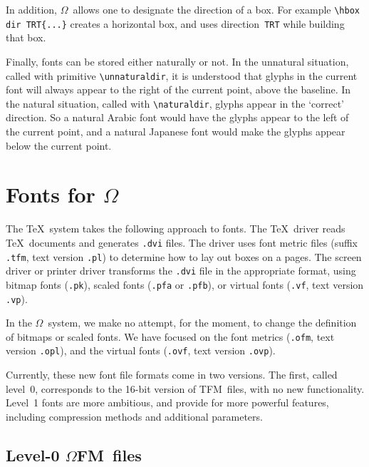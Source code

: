 \documentclass[fleqn]{article}
\newcommand{\OMEGA}{$\Omega$}
\newcommand{\OFM}{\OMEGA FM}
\newcommand{\TFM}{TFM}
\begin{document}
{In addition, \OMEGA\ allows one to designate the direction of a box.
For example \verb|\hbox dir TRT{...}| creates a horizontal box,
and uses direction~\texttt{TRT} while building that box.

Finally, fonts can be stored either naturally or not.  In the unnatural
situation, called with primitive \verb|\unnaturaldir|, it is understood
that glyphs in the current font will always appear to the right of the
current point, above the baseline.  In the natural situation, called
with \verb|\naturaldir|, glyphs appear in the `correct' direction.  So a
natural Arabic font would have the glyphs appear to the left of the
current point, and a natural Japanese font would make the glyphs appear
below the current point.
}

\section{Fonts for \OMEGA}

The \TeX\ system takes the following approach to fonts.  The \TeX\ driver
reads \TeX\ documents and generates \texttt{.dvi} files.  The driver
uses font metric files (suffix \texttt{.tfm}, text version \texttt{.pl})
to determine how to lay out boxes on a pages.  The screen
driver or printer driver transforms the \texttt{.dvi} file in the
appropriate format, using bitmap fonts (\texttt{.pk}), scaled fonts
(\texttt{.pfa} or \texttt{.pfb}), or virtual fonts (\texttt{.vf},
text version \texttt{.vp}).

In the \OMEGA\ system, we make no attempt, for the moment, to change the
definition of bitmaps or scaled fonts.  We have focused on the font
metrics (\texttt{.ofm}, text version \texttt{.opl}), and the 
virtual fonts (\texttt{.ovf}, text version \texttt{.ovp}).

Currently, these new font file formats come in two versions.  The first,
called level~0, corresponds to the 16-bit version of \TFM\ files, with
no new functionality.  Level~1 fonts are more ambitious, and provide
for more powerful features, including compression methods and additional 
parameters.

\subsection{Level-0 \OFM\ files}
\end{document}
